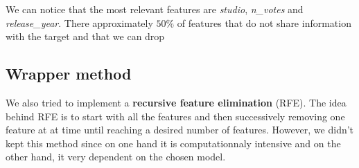 We can notice that the most relevant features are \textit{studio}, \textit{n_votes} and \textit{release_year}. There approximately $50\%$ of features that do not share information with the target and that we can drop

\subsection{Wrapper method}

We also tried to implement a \textbf{recursive feature elimination} (RFE). The idea behind RFE is to start with all the features and then successively removing one feature at at time until reaching a desired number of features. However, we didn't kept this method since on one hand it is computationnaly intensive and on the other hand, it very dependent on the chosen model.

